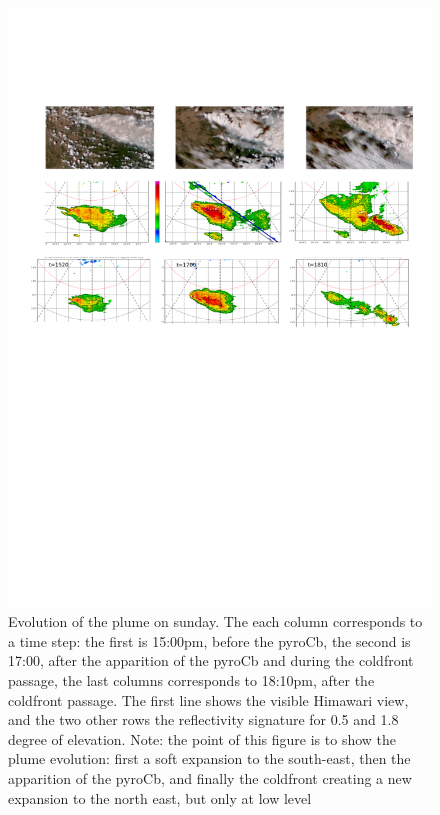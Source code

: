 \documentclass[12pt]{article}
\begin{document}
\begin{figure}[position]
   \caption{\label{3steps} Evolution of the plume on sunday. The each column corresponds to a time step: the first is 15:00pm, before the pyroCb, the second is 17:00, after the apparition of the pyroCb and during the coldfront passage, the last columns corresponds to 18:10pm, after the coldfront passage. The first line shows the visible Himawari view, and the two other rows the reflectivity signature for 0.5 and 1.8 degree of elevation.   {\color{red} Note: the point of this figure is to show the plume evolution: first a soft expansion to the south-east, then the apparition of the pyroCb, and finally the coldfront creating a new expansion to the north east, but only at low level} }
   \includegraphics[width=\textwidth]{../figures/3main_steps.png}
\end{figure}
\end{document}
